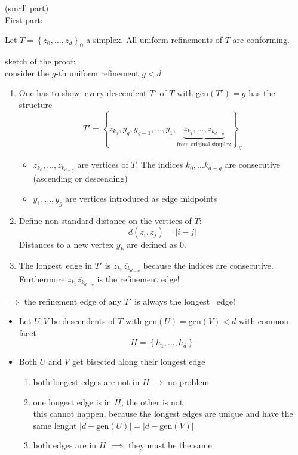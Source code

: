 \begin{proof_}
	(small part)\\
	First part:
	\begin{lemma}
		Let $T = \left\{ z_{0},\dots ,z_{d} \right\}_{0}$ a simplex. All uniform refinements of $T$ are conforming.
	\end{lemma}
		sketch of the proof:\\
		consider the $g$-th uniform refinement $g < d$ 
		\begin{enumerate}
			\item One has to show: every descendent $T'$ of $T$ with gen$(T')=g$ has the structure
				\begin{equation*}
					T' = \left\{ z_{k_{0}},y_{g},y_{g-1},\dots ,y_{1},\underbrace{z_{k_{1}},\dots, z_{k_{d-g}} }_{\text{from original simplex}} \right\}_{g}
				\end{equation*}
				\begin{itemize}
					\item $z_{k_{0}}, \dots ,z_{k_{d-g}}$ are vertices of $T$. The indices $k_{0},\dots k_{d-g}$ are consecutive (ascending or descending)
					\item $y_{1},\dots ,y_{g}$ are vertices introduced as edge midpoints
				\end{itemize}
			\item Define non-standard distance on the vertices of $T$:
				\begin{equation*}
					d(z_{i},z_{j}) = |i-j|
				\end{equation*}
				Distances to a new vertex $y_{k}$ are defined as $0$.
			\item The \glqq longest\grqq\ edge in $T'$ is $\overline{z_{k_{0}}z_{k_{d-g}}}$ because the indices are consecutive.
				Furthermore $\overline{z_{k_{0}}z_{k_{d-g}}}$ is the refinement edge!
		\end{enumerate}
		$\implies$ the refinement edge of any $T'$ is always the \glqq longest \grqq\ edge!
		\begin{itemize}
			\item Let $U,V$ be descendents of $T$ with gen$(U)=$gen$(V)< d$ with common facet 
				\begin{equation*}
					H = \left\{ h_{1},\dots ,h_{d} \right\}	
				\end{equation*}
				 
			\item Both $U$ and $V$ get bisected along their longest edge
				\begin{enumerate}[label = Case \arabic*]
					\item both longest edges are not in $H$ $\to$ no problem
					\item one longest edge is in $H$, the other is not\\
						this cannot happen, because the longest edges are unique and have the same lenght $|d- \text{gen}(U)|=|d-\text{gen}(V)|$
					\item both edges are in $H$ $\implies$ they must be the same
				\end{enumerate}
		\end{itemize}
\end{proof_}

